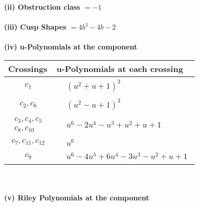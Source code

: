 \documentclass[1p]{elsarticle_modified}
\theoremstyle{definition}
\begin{document}
\flushleft \textbf{(ii) Obstruction class $= -1$}\\~\\
\flushleft \textbf{(iii) Cusp Shapes $= 4 b^3-4 b-2$}\\~\\
\newpage\renewcommand{\arraystretch}{1}
\flushleft \textbf{(iv) u-Polynomials at the component}\newline \\
\begin{tabular}{m{50pt}|m{274pt}}
Crossings & \hspace{64pt}u-Polynomials at each crossing \\
\hline $$\begin{aligned}c_{1}\end{aligned}$$&$\begin{aligned}
&(u^2+u+1)^3
\end{aligned}$\\
\hline $$\begin{aligned}c_{2},c_{6}\end{aligned}$$&$\begin{aligned}
&(u^2- u+1)^3
\end{aligned}$\\
\hline $$\begin{aligned}c_{3},c_{4},c_{5}\\c_{8},c_{10}\end{aligned}$$&$\begin{aligned}
&u^6-2 u^4- u^3+u^2+u+1
\end{aligned}$\\
\hline $$\begin{aligned}c_{7},c_{11},c_{12}\end{aligned}$$&$\begin{aligned}
&u^6
\end{aligned}$\\
\hline $$\begin{aligned}c_{9}\end{aligned}$$&$\begin{aligned}
&u^6-4 u^5+6 u^4-3 u^3- u^2+u+1
\end{aligned}$\\
\hline
\end{tabular}\\~\\
\newpage\renewcommand{\arraystretch}{1}
\flushleft \textbf{(v) Riley Polynomials at the component}\newline \\
\end{document}
